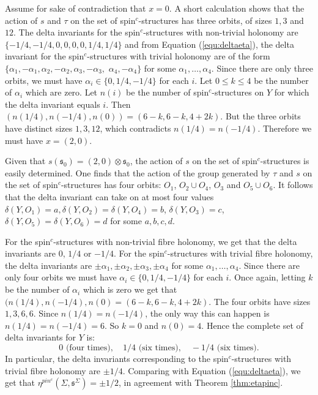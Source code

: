 \documentclass{amsart}
\theoremstyle{definition}
\theoremstyle{remark}
\numberwithin{equation}{section}
\begin{document}
Assume for sake of contradiction that $x = 0$. A short calculation shows that the action of $s$ and $\tau$ on the set of spin$^c$-structures has three orbits, of sizes $1,3$ and $12$. The delta invariants for the spin$^c$-structures with non-trivial holonomy are $\{-1/4, -1/4 , 0 , 0 , 0 , 0 , 1/4 , 1/4\}$ and from Equation (\ref{equ:deltaeta}), the delta invariant for the spin$^c$-structures with trivial holonomy are of the form $\{ \alpha_1 , -\alpha_1 , \alpha_2, -\alpha_2, \alpha_3 , -\alpha_3,$ $ \alpha_4 , -\alpha_4\}$ for some $\alpha_1, \dots , \alpha_4$. Since there are only three orbits, we must have $\alpha_i \in \{0 , 1/4 , -1/4\}$ for each $i$. Let $0 \le k \le 4$ be the number of $\alpha_i$ which are zero. Let $n(i)$ be the number of spin$^c$-structures on $Y$ for which the delta invariant equals $i$. Then $( n(1/4) , n(-1/4) , n(0) ) = ( 6-k , 6-k , 4+2k)$. But the three orbits have distinct sizes $1,3,12$, which contradicts $n(1/4) = n(-1/4)$. Therefore we must have $x = (2,0)$.

Given that $s(\mathfrak{s}_0) = (2,0) \otimes \mathfrak{s}_0$, the action of $s$ on the set of spin$^c$-structures is easily determined. One finds that the action of the group generated by $\tau$ and $s$ on the set of spin$^c$-structures has four orbits: $O_1$, $O_2 \cup O_4$, $O_3$ and $O_5 \cup O_6$. It follows that the delta invariant can take on at most four values $\delta(Y , O_1) = a , \delta(Y , O_2) = \delta(Y , O_4) = b$, $\delta(Y , O_3) = c$, $\delta(Y , O_5) = \delta(Y , O_6) = d$ for some $a,b,c,d$. 

For the spin$^c$-structures with non-trivial fibre holonomy, we get that the delta invariants are $0$, $1/4$ or $-1/4$. For the spin$^c$-structures with trivial fibre holonomy, the delta invariants are $\pm \alpha_1 , \pm \alpha_2 , \pm \alpha_3 , \pm \alpha_4 $ for some $\alpha_1, \dots , \alpha_4$. Since there are only four orbits we must have $\alpha_i \in \{ 0 , 1/4 , -1/4\}$ for each $i$. Once again, letting $k$ be the number of $\alpha_i$ which is zero we get that $(n(1/4) , n(-1/4) , n(0) = (6-k , 6-k , 4+2k)$. The four orbits have sizes $1,3,6,6$. Since $n(1/4) =n(-1/4)$, the only way this can happen is $n(1/4) = n(-1/4) = 6$. So $k=0$ and $n(0) = 4$. Hence the complete set of delta invariants for $Y$ is:
\[
0 \text{ (four times)}, \quad 1/4 \text{ (six times)}, \quad -1/4 \text{ (six times)}.
\]
In particular, the delta invariants corresponding to the spin$^c$-structures with trivial fibre holonomy are $\pm 1/4$. Comparing with Equation (\ref{equ:deltaeta}), we get that $\eta^{pin^c}(\Sigma , \mathfrak{s}^\Sigma) = \pm 1/2$, in agreement with Theorem \ref{thm:etapinc}.
\end{document}
